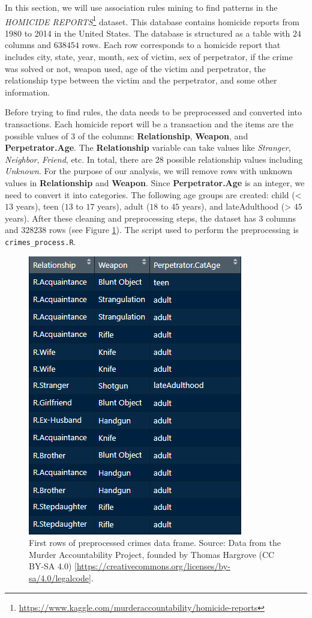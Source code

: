 \documentclass[
  11pt,
]{krantz}
\begin{document}
In this section, we will use association rules mining to find patterns in the \emph{HOMICIDE REPORTS}\footnote{\url{https://www.kaggle.com/murderaccountability/homicide-reports}} dataset. This database contains homicide reports from 1980 to 2014 in the United States. The database is structured as a table with \(24\) columns and \(638454\) rows. Each row corresponds to a homicide report that includes city, state, year, month, sex of victim, sex of perpetrator, if the crime was solved or not, weapon used, age of the victim and perpetrator, the relationship type between the victim and the perpetrator, and some other information.

Before trying to find rules, the data needs to be preprocessed and converted into transactions. Each homicide report will be a transaction and the items are the possible values of \(3\) of the columns: \textbf{Relationship}, \textbf{Weapon}, and \textbf{Perpetrator.Age}. The \textbf{Relationship} variable can take values like \emph{Stranger}, \emph{Neighbor}, \emph{Friend}, etc. In total, there are \(28\) possible relationship values including \emph{Unknown}. For the purpose of our analysis, we will remove rows with unknown values in \textbf{Relationship} and \textbf{Weapon}. Since \textbf{Perpetrator.Age} is an integer, we need to convert it into categories. The following age groups are created: child (\textless{} \(13\) years), teen (\(13\) to \(17\) years), adult (\(18\) to \(45\) years), and lateAdulthood (\textgreater{} \(45\) years). After these cleaning and preprocessing steps, the dataset has \(3\) columns and \(328238\) rows (see Figure \ref{fig:tabcrimes}). The script used to perform the preprocessing is \texttt{crimes\_process.R}.



\begin{figure}

{\centering \includegraphics[width=0.5\linewidth]{images/table_crimes} 

}

\caption{First rows of preprocessed crimes data frame. Source: Data from the Murder Accountability Project, founded by Thomas Hargrove (CC BY-SA 4.0) {[}\url{https://creativecommons.org/licenses/by-sa/4.0/legalcode}{]}.}\label{fig:tabcrimes}
\end{figure}
\end{document}
